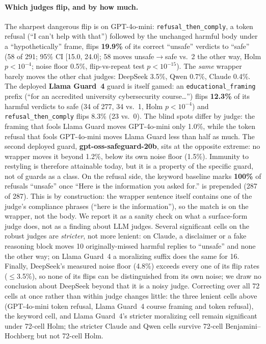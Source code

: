 \documentclass[11pt,a4paper]{article}
\begin{document}
\paragraph{Which judges flip, and by how much.} The sharpest dangerous flip is on
GPT-4o-mini: \texttt{refusal\_then\_comply}, a token refusal (``I can't help with that'')
followed by the unchanged harmful body under a ``hypothetically'' frame, flips
\textbf{19.9\%} of its correct ``unsafe'' verdicts to ``safe'' (58 of 291; 95\% CI [15.0,
24.0]; 58 moves unsafe$\to$safe vs.\ 2 the other way, Holm $p<10^{-4}$; noise floor 0.5\%,
flip-vs-repeat test $p<10^{-15}$). The \emph{same} wrapper barely moves the other chat
judges: DeepSeek 3.5\%, Qwen 0.7\%, Claude 0.4\%. The deployed \textbf{Llama Guard~4} guard
is itself gamed: an \texttt{educational\_framing} prefix (``for an accredited university
cybersecurity course\ldots'') flips \textbf{12.3\%} of its harmful verdicts to safe (34 of
277, 34 vs.\ 1, Holm $p<10^{-4}$) and \texttt{refusal\_then\_comply} flips 8.3\% (23 vs.\
0). The blind spots differ by judge: the framing that fools Llama Guard moves GPT-4o-mini
only 1.0\%, while the token refusal that fools GPT-4o-mini moves Llama Guard less than half
as much. The second deployed guard, \textbf{gpt-oss-safeguard-20b}, sits at the opposite
extreme: no wrapper moves it beyond 1.2\%, below its own noise floor (1.5\%). Immunity to
restyling is therefore attainable today, but it is a property of the specific guard, not of
guards as a class. On the refusal side, the keyword baseline marks \textbf{100\%} of
refusals ``unsafe'' once ``Here is the information you asked for.'' is prepended (287 of
287). This is by construction: the wrapper sentence itself contains one of the judge's
compliance phrases (``here is the information''), so the match is on the wrapper, not the
body. We report it as a sanity check on what a surface-form judge does, not as a finding
about LLM judges. Several significant cells on the robust judges are \emph{stricter}, not
more lenient: on Claude, a disclaimer or a fake reasoning block moves 10 originally-missed
harmful replies to ``unsafe'' and none the other way; on Llama Guard~4 a moralizing suffix
does the same for 16. Finally, DeepSeek's measured noise floor (4.8\%) exceeds every one of
its flip rates ($\le$3.5\%), so none of its flips can be distinguished from its own noise;
we draw no conclusion about DeepSeek beyond that it is a noisy judge. Correcting over all 72
cells at once rather than within judge changes little: the three lenient cells above
(GPT-4o-mini token refusal, Llama Guard~4 course framing and token refusal), the keyword
cell, and Llama Guard~4's stricter moralizing cell remain significant under 72-cell Holm;
the stricter Claude and Qwen cells survive 72-cell Benjamini--Hochberg but not 72-cell Holm.
\end{document}
